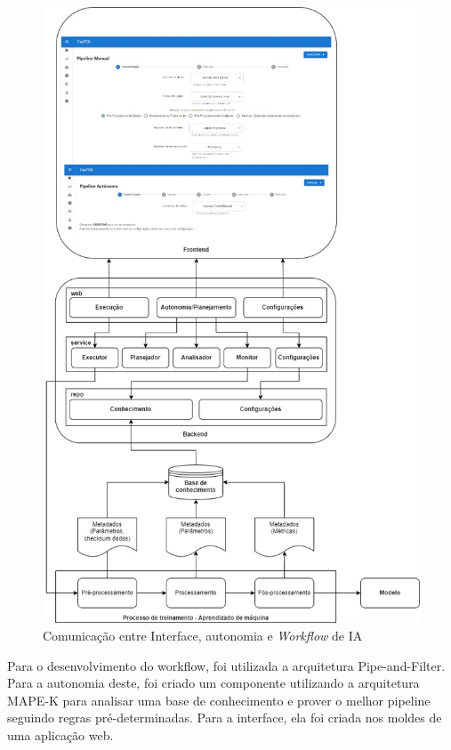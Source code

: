 \documentclass{article}
\begin{document}
\begin{figure}[H]
\centering
\includegraphics[scale=0.4]{images/backend-frontend-ml.jpg}
\caption {Comunicação entre Interface, autonomia e \textit{Workflow} de IA}
\label{fig:BackendFrontendML}
\end{figure}

Para o desenvolvimento do workflow, foi utilizada a arquitetura Pipe-and-Filter. Para a autonomia deste, foi criado um componente utilizando a arquitetura MAPE-K para analisar uma base de conhecimento e prover o melhor pipeline seguindo regras pré-determinadas. Para a interface, ela foi criada nos moldes de uma aplicação web. 
\end{document}
